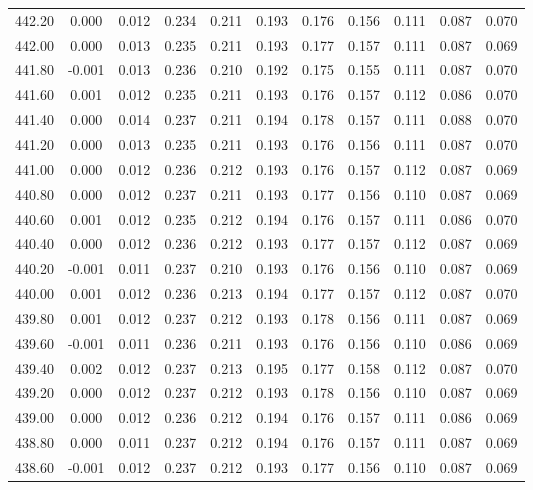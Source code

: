 \begin{longtable}{cccccccccc}
    442.20 &  0.000 &  0.012 &  0.234 &  0.211 &  0.193 &  0.176 &  0.156 &  0.111 &  0.087 &  0.070 \\
    442.00 &  0.000 &  0.013 &  0.235 &  0.211 &  0.193 &  0.177 &  0.157 &  0.111 &  0.087 &  0.069 \\
    441.80 & -0.001 &  0.013 &  0.236 &  0.210 &  0.192 &  0.175 &  0.155 &  0.111 &  0.087 &  0.070 \\
    441.60 &  0.001 &  0.012 &  0.235 &  0.211 &  0.193 &  0.176 &  0.157 &  0.112 &  0.086 &  0.070 \\
    441.40 &  0.000 &  0.014 &  0.237 &  0.211 &  0.194 &  0.178 &  0.157 &  0.111 &  0.088 &  0.070 \\
    441.20 &  0.000 &  0.013 &  0.235 &  0.211 &  0.193 &  0.176 &  0.156 &  0.111 &  0.087 &  0.070 \\
    441.00 &  0.000 &  0.012 &  0.236 &  0.212 &  0.193 &  0.176 &  0.157 &  0.112 &  0.087 &  0.069 \\
    440.80 &  0.000 &  0.012 &  0.237 &  0.211 &  0.193 &  0.177 &  0.156 &  0.110 &  0.087 &  0.069 \\
    440.60 &  0.001 &  0.012 &  0.235 &  0.212 &  0.194 &  0.176 &  0.157 &  0.111 &  0.086 &  0.070 \\
    440.40 &  0.000 &  0.012 &  0.236 &  0.212 &  0.193 &  0.177 &  0.157 &  0.112 &  0.087 &  0.069 \\
    440.20 & -0.001 &  0.011 &  0.237 &  0.210 &  0.193 &  0.176 &  0.156 &  0.110 &  0.087 &  0.069 \\
    440.00 &  0.001 &  0.012 &  0.236 &  0.213 &  0.194 &  0.177 &  0.157 &  0.112 &  0.087 &  0.070 \\
    439.80 &  0.001 &  0.012 &  0.237 &  0.212 &  0.193 &  0.178 &  0.156 &  0.111 &  0.087 &  0.069 \\
    439.60 & -0.001 &  0.011 &  0.236 &  0.211 &  0.193 &  0.176 &  0.156 &  0.110 &  0.086 &  0.069 \\
    439.40 &  0.002 &  0.012 &  0.237 &  0.213 &  0.195 &  0.177 &  0.158 &  0.112 &  0.087 &  0.070 \\
    439.20 &  0.000 &  0.012 &  0.237 &  0.212 &  0.193 &  0.178 &  0.156 &  0.110 &  0.087 &  0.069 \\
    439.00 &  0.000 &  0.012 &  0.236 &  0.212 &  0.194 &  0.176 &  0.157 &  0.111 &  0.086 &  0.069 \\
    438.80 &  0.000 &  0.011 &  0.237 &  0.212 &  0.194 &  0.176 &  0.157 &  0.111 &  0.087 &  0.069 \\
    438.60 & -0.001 &  0.012 &  0.237 &  0.212 &  0.193 &  0.177 &  0.156 &  0.110 &  0.087 &  0.069 \\

\end{longtable}
